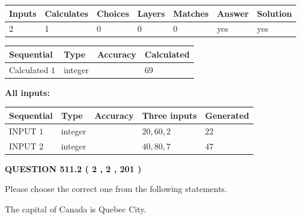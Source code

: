 \documentclass[12pt]{article}
\begin{document}
 

 
   
   
   
   
\noindent\begin{tabular}{|l|l|l|l|l|l|l|}
 \hline
Inputs & Calculates & Choices & Layers & Matches & Answer & Solution \\ \hline
 2  & 
 1  & 
 0
  & 
 0  & 
 0  & 
  yes & 
  yes 
  \\ \hline
 \end{tabular}
   
   
   
   
\noindent{}
   
   
  
  
\noindent\begin{tabular}{|l|l|l|l|}
\hline
 Sequential & Type & Accuracy & Calculated \\ 
\hline
 
 
  Calculated $  1 $ & integer &  & 
  $ 69 $ 
 \\  \hline  
 \end{tabular}
   
   
   
   
\noindent\vspace{0.1in}\hspace{-0.08in} {\textbf{\Large{All inputs: }}}
   
   
  
  
\noindent\begin{tabular}{|l|l|l|l|l|}
\hline
 Sequential & Type & Accuracy & Three inputs & Generated \\ 
\hline
 
 
  INPUT $  1 $ & integer &  & $
 20
 , 
 60
 , 
 2
 $ & $ 22 $ 
 \\  \hline  
 
 
  INPUT $  2 $ & integer &  & $
 40
 , 
 80
 , 
 7
 $ & $ 47 $ 
 \\  \hline  
 \end{tabular}
   
   
  
\vspace{0.2in}
  
{\textbf{\Large{QUESTION
511.2 
 ( 2 , 2 , 201 )
}}}
  
  
Please choose the correct one from the following statements.
 
 
The capital of Canada is Quebec City.
 
\end{document}
